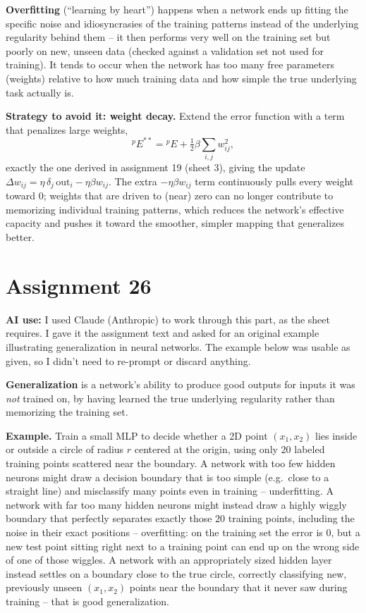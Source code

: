 \documentclass[11pt,a4paper]{article}
\begin{document}
\textbf{Overfitting} (``learning by heart'') happens when a network ends up fitting the specific noise
and idiosyncrasies of the training patterns instead of the underlying regularity behind them -- it then
performs very well on the training set but poorly on new, unseen data (checked against a validation set
not used for training). It tends to occur when the network has too many free parameters (weights)
relative to how much training data and how simple the true underlying task actually is.

\textbf{Strategy to avoid it: weight decay.} Extend the error function with a term that penalizes large
weights,
\[
  {}^pE^{**} = {}^pE + \tfrac12\beta\sum_{i,j}w_{ij}^2,
\]
exactly the one derived in assignment 19 (sheet 3), giving the update
$\Delta w_{ij}=\eta\,\delta_j\,\mathrm{out}_i-\eta\beta w_{ij}$. The extra $-\eta\beta w_{ij}$ term
continuously pulls every weight toward $0$; weights that are driven to (near) zero can no longer
contribute to memorizing individual training patterns, which reduces the network's effective capacity
and pushes it toward the smoother, simpler mapping that generalizes better.

\section*{Assignment 26}

\textbf{AI use:} I used Claude (Anthropic) to work through this part, as the sheet requires. I gave it
the assignment text and asked for an original example illustrating generalization in neural networks.
The example below was usable as given, so I didn't need to re-prompt or discard anything.

\textbf{Generalization} is a network's ability to produce good outputs for inputs it was \emph{not}
trained on, by having learned the true underlying regularity rather than memorizing the training set.

\textbf{Example.} Train a small MLP to decide whether a 2D point $(x_1,x_2)$ lies inside or outside a
circle of radius $r$ centered at the origin, using only $20$ labeled training points scattered near the
boundary. A network with too few hidden neurons might draw a decision boundary that is too simple (e.g.\
close to a straight line) and misclassify many points even in training -- underfitting. A network with
far too many hidden neurons might instead draw a highly wiggly boundary that perfectly separates exactly
those $20$ training points, including the noise in their exact positions -- overfitting: on the training
set the error is $0$, but a new test point sitting right next to a training point can end up on the
wrong side of one of those wiggles. A network with an appropriately sized hidden layer instead settles
on a boundary close to the true circle, correctly classifying new, previously unseen $(x_1,x_2)$ points
near the boundary that it never saw during training -- that is good generalization.
\end{document}

